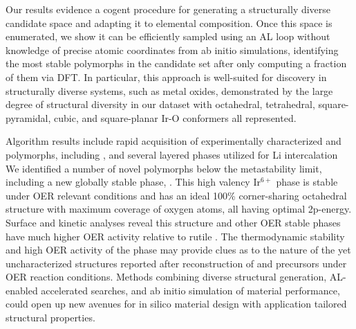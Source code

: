 


%
Our results evidence a cogent procedure for generating a structurally diverse candidate space and adapting it to elemental composition.
%
Once this space is enumerated, we show it can be efficiently sampled using an AL loop without knowledge of precise atomic coordinates from ab initio simulations, identifying the most stable polymorphs in the candidate set after only computing a fraction of them via DFT.
%
In particular, this approach is well-suited for discovery in structurally diverse systems, such as metal oxides, demonstrated by the large degree of structural diversity in our dataset with octahedral, tetrahedral,  square-pyramidal,  cubic,  and  square-planar Ir-O conformers all represented.


%
%
Algorithm results include rapid acquisition of experimentally characterized \IrOtwo and \IrOthree polymorphs, including \rIrOtwo, and several layered \IrOthree phases utilized for Li intercalation
%
We identified a number of novel \IrOthree polymorphs below the metastability limit, including a new globally stable phase, \aIrOthree.
%
This high valency Ir$^{6+}$ phase is stable under OER relevant conditions and has an ideal 100\% corner-sharing octahedral structure with maximum coverage of oxygen atoms, all having optimal 2p-energy.
%
Surface and kinetic analyses reveal this structure and other OER stable \IrOthree phases have much higher OER activity relative to rutile \IrOtwo.
%
The thermodynamic stability and high OER activity of the \aIrOthree phase may provide clues as to the nature of the yet uncharacterized structures reported after reconstruction of  and \IrOx precursors under OER reaction conditions.
%
Methods combining diverse structural generation, AL-enabled accelerated searches, and ab initio simulation of material performance, could open up new avenues for in silico material design with application tailored structural properties.






